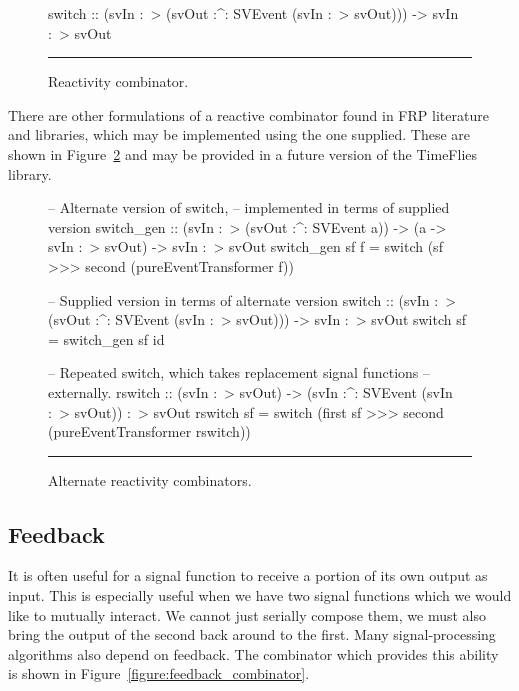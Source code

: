 \begin{figure}
\begin{code}
switch ::    (svIn :~> (svOut :^: SVEvent (svIn :~> svOut)))
          -> svIn :~> svOut
\end{code}
\hrule
\caption{Reactivity combinator.}
\label{figure:switch_combinator}
\end{figure}

There are other formulations of a reactive combinator found in FRP literature
and libraries, which may be implemented using the one supplied. These are shown
in Figure~\ref{figure:alternate_switching_combinators} and may be provided in a
future version of the TimeFlies library.

\begin{figure}
\begin{code}
-- Alternate version of switch,
-- implemented in terms of supplied version
switch_gen ::    (svIn :~> (svOut :^: SVEvent a))
              -> (a -> svIn :~> svOut)
              -> svIn :~> svOut
switch_gen sf f =
  switch (sf >>> second (pureEventTransformer f))

-- Supplied version in terms of alternate version
switch ::    (svIn :~> (svOut :^: SVEvent (svIn :~> svOut)))
          -> svIn :~> svOut
switch sf = switch_gen sf id

-- Repeated switch, which takes replacement signal functions
-- externally.
rswitch ::    (svIn :~> svOut)
           -> (svIn :^: SVEvent (svIn :~> svOut)) :~> svOut
rswitch sf =
  switch (first sf >>> second (pureEventTransformer rswitch))
\end{code}
\hrule
\caption{Alternate reactivity combinators.}
\label{figure:alternate_switching_combinators}
\end{figure}

\subsection{Feedback}
\label{subsection:System_Design_and_Interface-Combinators-Feedback}

It is often useful for a signal function to receive a portion of its
own output as input. This is especially useful when we have two
signal functions which we would like to mutually interact. We cannot
just serially compose them, we must also bring the output of the second
back around to the first. Many signal-processing algorithms also depend
on feedback. The combinator which provides this ability is shown
in Figure~\ref{figure:feedback_combinator}. 

